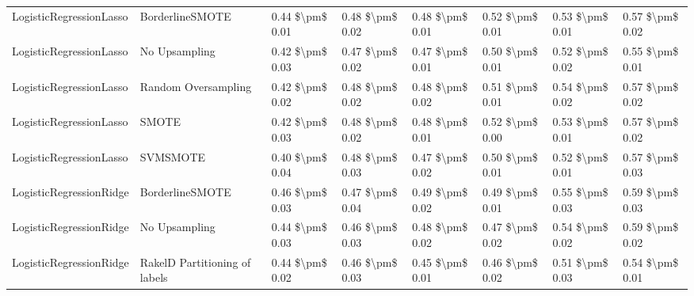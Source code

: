 \begin{tabular}{llllllll}
        LogisticRegressionLasso &               BorderlineSMOTE & 0.44 \$\textbackslash pm\$ 0.01 &           0.48 \$\textbackslash pm\$ 0.02 &       0.48 \$\textbackslash pm\$ 0.01 &        0.52 \$\textbackslash pm\$ 0.01 &                         0.53 \$\textbackslash pm\$ 0.01 &     0.57 \$\textbackslash pm\$ 0.02 \\
        LogisticRegressionLasso &                 No Upsampling & 0.42 \$\textbackslash pm\$ 0.03 &           0.47 \$\textbackslash pm\$ 0.02 &       0.47 \$\textbackslash pm\$ 0.01 &        0.50 \$\textbackslash pm\$ 0.01 &                         0.52 \$\textbackslash pm\$ 0.02 &     0.55 \$\textbackslash pm\$ 0.01 \\
        LogisticRegressionLasso &           Random Oversampling & 0.42 \$\textbackslash pm\$ 0.02 &           0.48 \$\textbackslash pm\$ 0.02 &       0.48 \$\textbackslash pm\$ 0.02 &        0.51 \$\textbackslash pm\$ 0.01 &                         0.54 \$\textbackslash pm\$ 0.02 &     0.57 \$\textbackslash pm\$ 0.02 \\
        LogisticRegressionLasso &                         SMOTE & 0.42 \$\textbackslash pm\$ 0.03 &           0.48 \$\textbackslash pm\$ 0.02 &       0.48 \$\textbackslash pm\$ 0.01 &        0.52 \$\textbackslash pm\$ 0.00 &                         0.53 \$\textbackslash pm\$ 0.01 &     0.57 \$\textbackslash pm\$ 0.02 \\
        LogisticRegressionLasso &                      SVMSMOTE & 0.40 \$\textbackslash pm\$ 0.04 &           0.48 \$\textbackslash pm\$ 0.03 &       0.47 \$\textbackslash pm\$ 0.02 &        0.50 \$\textbackslash pm\$ 0.01 &                         0.52 \$\textbackslash pm\$ 0.01 &     0.57 \$\textbackslash pm\$ 0.03 \\
        LogisticRegressionRidge &               BorderlineSMOTE & 0.46 \$\textbackslash pm\$ 0.03 &           0.47 \$\textbackslash pm\$ 0.04 &       0.49 \$\textbackslash pm\$ 0.02 &        0.49 \$\textbackslash pm\$ 0.01 &                         0.55 \$\textbackslash pm\$ 0.03 &     0.59 \$\textbackslash pm\$ 0.03 \\
        LogisticRegressionRidge &                 No Upsampling & 0.44 \$\textbackslash pm\$ 0.03 &           0.46 \$\textbackslash pm\$ 0.03 &       0.48 \$\textbackslash pm\$ 0.02 &        0.47 \$\textbackslash pm\$ 0.02 &                         0.54 \$\textbackslash pm\$ 0.02 &     0.59 \$\textbackslash pm\$ 0.02 \\
        LogisticRegressionRidge & RakelD Partitioning of labels & 0.44 \$\textbackslash pm\$ 0.02 &           0.46 \$\textbackslash pm\$ 0.03 &       0.45 \$\textbackslash pm\$ 0.01 &        0.46 \$\textbackslash pm\$ 0.02 &                         0.51 \$\textbackslash pm\$ 0.03 &     0.54 \$\textbackslash pm\$ 0.01 \\

\end{tabular}
